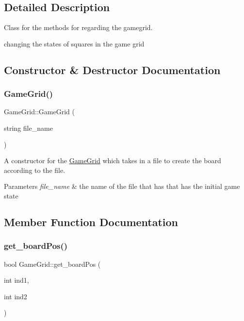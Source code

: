 \subsection{Detailed Description}
Class for the methods for regarding the gamegrid. 

changing the states of squares in the game grid 

\subsection{Constructor \& Destructor Documentation}
\mbox{\label{class_game_grid_a0844b34c3f8bd3a41b0dff38ffb10f36}} 
\subsubsection{\texorpdfstring{GameGrid()}{GameGrid()}}
{\footnotesize\ttfamily Game\+Grid\+::\+Game\+Grid (\begin{DoxyParamCaption}\item[{string}]{file\+\_\+name }\end{DoxyParamCaption})}



A constructor for the \mbox{\hyperlink{class_game_grid}{Game\+Grid}} which takes in a file to create the board according to the file. 


\begin{DoxyParams}{Parameters}
{\em file\+\_\+name} & the name of the file that has that has the initial game state \\
\hline
\end{DoxyParams}


\subsection{Member Function Documentation}
\mbox{\label{class_game_grid_af67b81833fc836276077ba8d928a0111}} 
\subsubsection{\texorpdfstring{get\_boardPos()}{get\_boardPos()}}
{\footnotesize\ttfamily bool Game\+Grid\+::get\+\_\+board\+Pos (\begin{DoxyParamCaption}\item[{int}]{ind1,  }\item[{int}]{ind2 }\end{DoxyParamCaption})}



